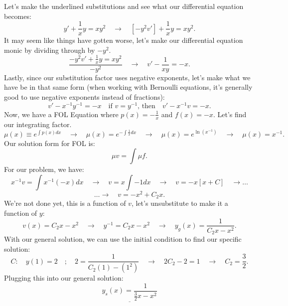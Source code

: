 \documentclass[a4paper,12pt]{article}
\begin{document}
Let's make the underlined substitutions and see what our differential equation becomes:
$$ y' + \frac{1}{x}y = xy^2 \quad\rightarrow \quad [-y^2v'] + \frac{1}{x}y = xy^2. $$
It may seem like things have gotten worse, let's make our differential equation monic by dividing through by $-y^2$.
$$ \frac{-y^2v' + \frac{1}{x}y = xy^2}{-y^2} \quad\rightarrow \quad v' -\frac{1}{xy} = -x. $$
Lastly, since our substitution factor uses negative exponents, let's make what we have be in that same form (when working with Bernoulli equations, it's generally good to use negative exponents instead of fractions):
$$ v' - x^{-1}y^{-1} = -x \quad\text{if $v=y^{-1}$, then}\quad v' - x^{-1}v = -x. $$
Now, we have a FOL Equation where $p(x) = -\frac{1}{x}$ and $f(x)=-x$. Let's find our integrating factor.
$$ \mu(x) \equiv e^{\int p(x)dx} \quad\rightarrow \quad \mu(x) = e^{-\int \frac{1}{x} dx} \quad\rightarrow \quad \mu(x) = e^{\ln{(x^{-1})}} \quad\rightarrow \quad \mu(x) = x^{-1}. $$
Our solution form for FOL is:
$$ \mu v = \int \mu f.$$
For our problem, we have:
$$ x^{-1}v = \int x^{-1}(-x)dx \quad\rightarrow \quad v = x\int -1dx \quad\rightarrow \quad v = -x[x + C] \quad\rightarrow \ldots $$
$$\ldots\rightarrow \quad v = -x^2 + C_2x. $$
We're not done yet, this is a function of $v$, let's unsubstitute to make it a function of $y$:
$$ v(x) =  C_2x -x^2 \quad\rightarrow \quad y^{-1} = C_2x-x^2 \quad \rightarrow \quad y_g(x) = \frac{1}{C_2x-x^2}.$$
With our general solution, we can use the initial condition to find our specific solution:
$$ C: \quad y(1)=2\quad;\quad 2 = \frac{1}{C_2(1) - (1^2)} \quad\rightarrow \quad 2C_2 -2 = 1 \quad\rightarrow \quad  C_2 = \frac{3}{2}. $$
Plugging this into our general solution:
$$ \underline{\boxed{y_s(x) = \frac{1}{\frac{3}{2}x - x^2}}} $$
\end{document}

